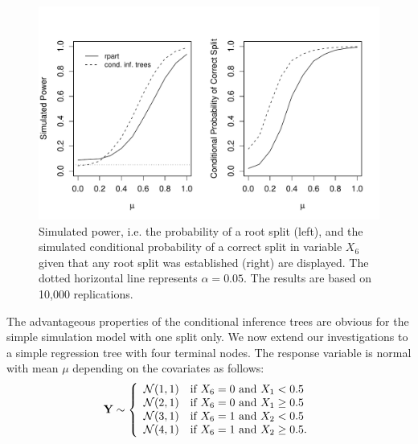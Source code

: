 \begin{figure}[t]
\begin{center}
\includegraphics[width = \textwidth]{power_split}
\caption{Simulated power, i.e. the probability of a root split (left), and the simulated
         conditional probability of a correct split in variable $X_6$ given
         that any root split was established (right) are displayed. The 
         dotted horizontal line represents $\alpha = 0.05$.
         The results are based on 10,000 replications. \label{power}}
\end{center}
\end{figure}

The advantageous properties of the conditional inference trees are obvious
for the simple simulation model with one split only. We now extend our
investigations to a simple regression tree with four terminal nodes. The
response variable is normal with mean $\mu$ depending on the covariates as
follows:
\begin{eqnarray} \label{part}
\mathbf{Y} \sim \left\{ \begin{array}{ll} 
             \mathcal{N}(1,1) & \text{if } X_6 = 0 \text{ and } X_1 < 0.5 \\
             \mathcal{N}(2,1) & \text{if } X_6 = 0 \text{ and } X_1 \ge 0.5 \\
             \mathcal{N}(3,1) & \text{if } X_6 = 1 \text{ and } X_2 < 0.5 \\
             \mathcal{N}(4,1) & \text{if } X_6 = 1 \text{ and } X_2 \ge 0.5.
            \end{array} \right.
\end{eqnarray}


